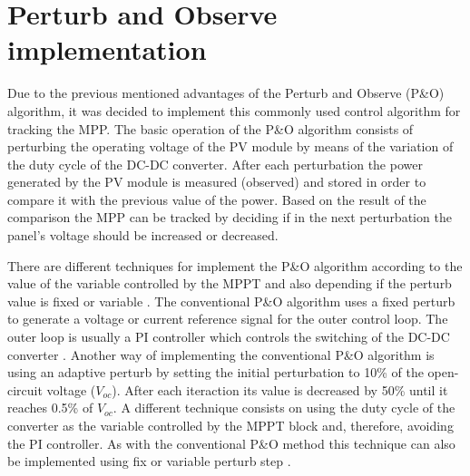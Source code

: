\section{Perturb and Observe implementation}\label{MPPTImplementation}

Due to the previous mentioned advantages of the Perturb and Observe (P\&O)  algorithm, it was decided to implement this commonly used control algorithm for tracking the MPP. The basic operation of the P\&O algorithm consists of perturbing the operating voltage of the PV module by means of the variation of the duty cycle of the DC-DC converter. After each perturbation the power generated by the PV module is measured (observed) and stored in order to compare it with the previous value of the power. Based on the result of the comparison the MPP can be tracked by deciding if in the next perturbation the panel's voltage should be increased or decreased.

There are different techniques for implement the P\&O algorithm according to the value of the variable controlled by the MPPT and also depending if the perturb value is fixed or variable . The conventional P\&O algorithm uses a fixed perturb to generate a voltage or current reference signal for the outer control loop. The outer loop is usually a PI controller which controls the switching of the DC-DC converter . Another way of implementing the conventional P\&O algorithm is using an adaptive perturb by setting the initial perturbation to 10\% of the open-circuit voltage ($V_{oc}$). After each iteraction its value is decreased by 50\% until it reaches 0.5\%
of $V_{oc}$.  A different technique consists on using the duty cycle of the converter as the variable controlled by the MPPT block and, therefore, avoiding the PI controller. As with the conventional P\&O method this technique can also be implemented using fix or variable perturb step . 

